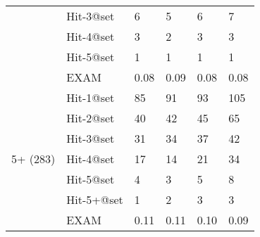\begin{table}[t]
{\begin{center}
\begin{tabular}{p{1cm}<{\centering}|p{1.33cm}<{\centering}|p{1cm}<{\centering}|p{0.7cm}<{\centering}|p{1.2cm}<{\centering}|p{1.2cm}<{\centering}}
										& Hit-3@set     & 6 & 5 & 6 & 7 \\
										& Hit-4@set     & 3 & 2 & 3 & 3 \\
										& Hit-5@set     & 1 & 1 & 1 & 1 \\
										& EXAM          & 0.08 & 0.09 & 0.08 & 0.08 \\
				\hline
				\multirow{8}{*}{5+ (283)}  & Hit-1@set     & 85 & 91 & 93 & 105 \\
								 		& Hit-2@set     & 40 & 42 & 45 & 65 \\
										& Hit-3@set     & 31 & 34 & 37 & 42 \\
								 		& Hit-4@set     & 17 & 14 & 21 & 34 \\
										& Hit-5@set     & 4 & 3 & 5 & 8 \\
										& Hit-5+@set    & 1 & 2 & 3 & 3 \\
										& EXAM          & 0.11 & 0.11 & 0.10 & 0.09 \\
				\hline
			\end{tabular}
			
			\label{fig:rq1-1}
		\end{center}
	}
\end{table}







